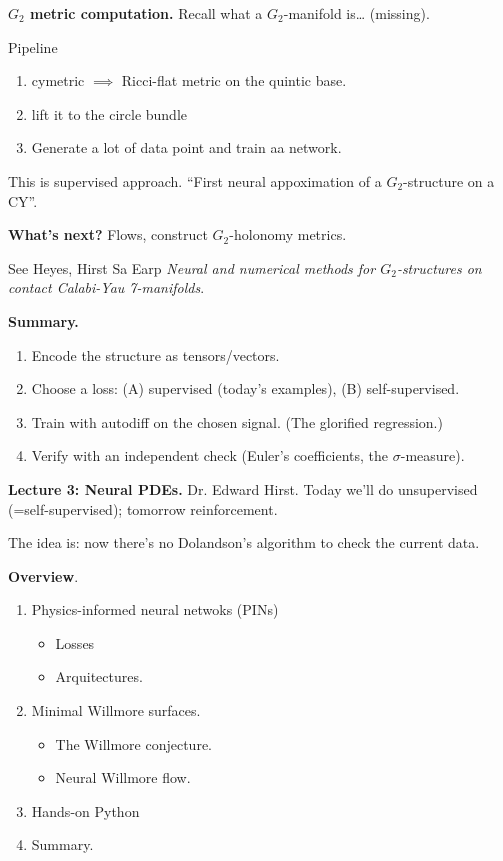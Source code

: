 \medskip\noindent
{\bf $G_2$ metric computation.}
Recall what a $G_2$-manifold is… (missing).

Pipeline
\begin{enumerate}
\item cymetric $\implies $ Ricci-flat metric
on the quintic base.
\item lift it to the circle bundle
\item Generate a lot of data point and train
aa network.
\end{enumerate}

\noindent
This is supervised approach.
``First neural appoximation of a
$G_2$-structure on a CY''.

\medskip\noindent
{\bf What's next?} Flows, construct 
$G_2$-holonomy metrics.

See Heyes, Hirst Sa Earp {\it Neural and
numerical methods for $G_2$-structures on
contact Calabi-Yau 7-manifolds}.

\medskip\noindent
{\bf Summary.}
\begin{enumerate}
\item Encode the structure as
tensors/vectors.
\item Choose a loss: (A) supervised (today's
examples), (B) self-supervised.
\item Train with autodiff on the chosen
signal. (The glorified regression.)
\item Verify with an independent check
(Euler's coefficients, the
$\sigma$-measure).
\end{enumerate}



\medskip\noindent
{\bf Lecture 3: Neural PDEs.} Dr. Edward
Hirst. Today we'll do unsupervised
(=self-supervised); tomorrow
reinforcement.

The idea is: now there's no Dolandson's
algorithm to check the current data.

\medskip\noindent
{\bf Overview}.
\begin{enumerate}
\item Physics-informed neural netwoks (PINs)
\begin{itemize}
\item Losses
\item Arquitectures.
\end{itemize}
\item Minimal Willmore surfaces.
\begin{itemize}
\item The Willmore conjecture.
\item Neural Willmore flow.
\end{itemize}
\item Hands-on Python

\item Summary.
\end{enumerate}

